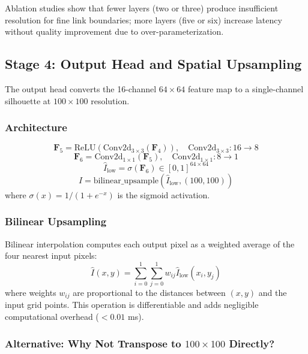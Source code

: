 \documentclass[12pt,a4paper,oneside]{report}
\begin{document}
Ablation studies show that fewer layers (two or three) produce insufficient resolution for fine link boundaries; more layers (five or six) increase latency without quality improvement due to over-parameterization.

\subsection{Stage 4: Output Head and Spatial Upsampling}

The output head converts the 16-channel $64 \times 64$ feature map to a single-channel silhouette at $100 \times 100$ resolution.

\subsubsection{Architecture}

\begin{equation}
\mathbf{F}_5 = \text{ReLU}(\text{Conv2d}_{3\times3}(\mathbf{F}_4)), \quad \text{Conv2d}_{3\times3}: 16 \rightarrow 8
\end{equation}
\begin{equation}
\mathbf{F}_6 = \text{Conv2d}_{1\times1}(\mathbf{F}_5), \quad \text{Conv2d}_{1\times1}: 8 \rightarrow 1
\end{equation}
\begin{equation}
\hat{I}_{\text{low}} = \sigma(\mathbf{F}_6) \in [0, 1]^{64 \times 64}
\end{equation}
\begin{equation}
\hat{I} = \text{bilinear\_upsample}(\hat{I}_{\text{low}}, (100, 100))
\end{equation}
where $\sigma(x) = 1/(1 + e^{-x})$ is the sigmoid activation.

\subsubsection{Bilinear Upsampling}

Bilinear interpolation computes each output pixel as a weighted average of the four nearest input pixels:
\begin{equation}
\hat{I}(x,y) = \sum_{i=0}^{1}\sum_{j=0}^{1} w_{ij} \hat{I}_{\text{low}}(x_i, y_j)
\end{equation}
where weights $w_{ij}$ are proportional to the distances between $(x,y)$ and the input grid points. This operation is differentiable and adds negligible computational overhead ($<0.01$ ms).

\subsubsection{Alternative: Why Not Transpose to $100 \times 100$ Directly?}
\end{document}
